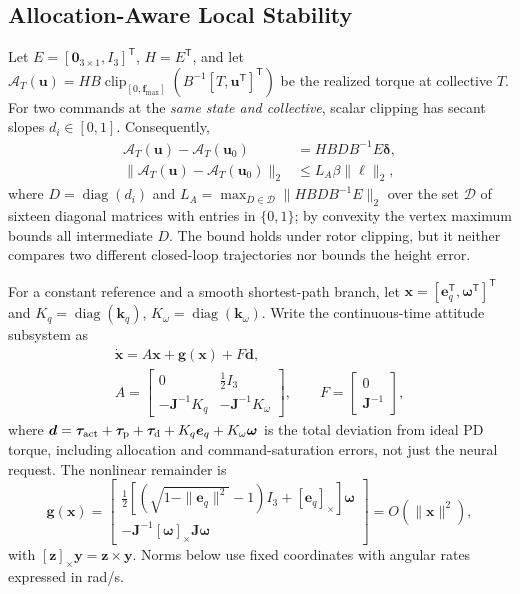 \documentclass[letterpaper, 10 pt, conference]{ieeeconf}
\newcommand{\T}{^{\mathsf T}}
\newcommand{\clip}{\operatorname{clip}}
\begin{document}
\subsection{Allocation-Aware Local Stability}
\label{sec:local}
Let $E=[\bm0_{3\times1},I_3]\T$, $H=E\T$, and let
$\mathcal A_T(\bm u)=HB\clip_{[0,\bm f_{\max}]}(B^{-1}[T,\bm u\T]\T)$
be the realized torque at collective $T$. For two commands at the
\emph{same state and collective}, scalar clipping has secant slopes
$d_i\in[0,1]$. Consequently,
\begin{align}
 \mathcal A_T(\bm u)-\mathcal A_T(\bm u_0)
 &=HBDB^{-1}E\bm\delta,\\
 \|\mathcal A_T(\bm u)-\mathcal A_T(\bm u_0)\|_2
 &\le L_A\beta\|\bm\ell\|_2,
 \label{eq:allocbound}
\end{align}
where $D=\operatorname{diag}(d_i)$ and
$L_A=\max_{D\in\mathcal D}\|HBDB^{-1}E\|_2$ over the set $\mathcal D$ of
sixteen diagonal matrices with entries in $\{0,1\}$; by convexity the
vertex maximum bounds all intermediate $D$. The bound holds under rotor
clipping, but it neither compares two different closed-loop trajectories
nor bounds the height error.

For a constant reference and a smooth shortest-path branch, let
$\bm x=[\bm e_q\T,\bm\omega\T]\T$ and
$K_q=\operatorname{diag}(\bm k_q)$, $K_\omega=\operatorname{diag}(\bm k_\omega)$.
Write the continuous-time attitude subsystem as
\begin{equation}
 \begin{gathered}
 \dot{\bm x}=A\bm x+\bm g(\bm x)+F\bm d,\\
 A=\begin{bmatrix}0&\frac12I_3\\-\bm J^{-1}K_q&-\bm J^{-1}K_\omega\end{bmatrix},
 \qquad F=\begin{bmatrix}0\\\bm J^{-1}\end{bmatrix},
 \end{gathered}
 \label{eq:localmodel}
\end{equation}
where $\bm d=\bm\tau_{\rm act}+\bm\tau_{\rm p}+\bm\tau_{\rm d}
 +K_q\bm e_q+K_\omega\bm\omega$ is the total deviation from ideal PD
torque, including allocation and command-saturation errors, not just the
neural request. The nonlinear remainder is
\begin{equation}
 \bm g(\bm x)=\begin{bmatrix}
 \tfrac12[(\sqrt{1-\|\bm e_q\|^2}-1)I_3+[\bm e_q]_\times]\bm\omega\\
 -\bm J^{-1}[\bm\omega]_\times\bm J\bm\omega
 \end{bmatrix}=O(\|\bm x\|^2),
 \label{eq:localremainder}
\end{equation}
with $[\bm z]_\times\bm y=\bm z\times\bm y$. Norms below use fixed
coordinates with angular rates expressed in rad/s.
\end{document}
